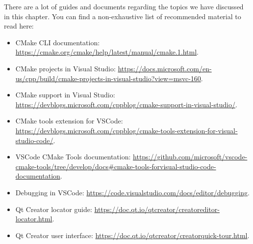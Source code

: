 There are a lot of guides and documents regarding the topics we have discussed in this chapter. You can find a non-exhaustive list of recommended material to read here:

\begin{itemize}
\item 
CMake CLI documentation: \url{https://cmake.org/cmake/help/latest/manual/cmake.1.html}.

\item
CMake projects in Visual Studio: \url{https://docs.microsoft.com/en-us/cpp/build/cmake-projects-in-visual-studio?view=msvc-160}.

\item
CMake support in Visual Studio: \url{https://devblogs.microsoft.com/cppblog/cmake-support-in-visual-studio/}.

\item
CMake tools extension for VSCode: \url{https://devblogs.microsoft.com/cppblog/cmake-tools-extension-for-visual-studio-code/}.

\item
VSCode CMake Tools documentation: \url{https://github.com/microsoft/vscode-cmake-tools/tree/develop/docs#cmake-tools-forvisual-studio-code-documentation}.

\item
Debugging in VSCode: \url{https://code.visualstudio.com/docs/editor/debugging}.

\item
Qt Creator locator guide: \url{https://doc.qt.io/qtcreator/creatoreditor-locator.html}.

\item
Qt Creator user interface: \url{https://doc.qt.io/qtcreator/creatorquick-tour.html}.
\end{itemize}